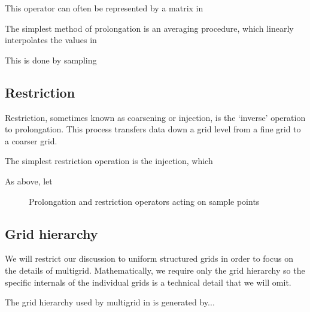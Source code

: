 This operator can often be represented by a matrix in 

The simplest method of prolongation is an averaging procedure, which linearly interpolates the values in

This is done by sampling




\subsection{Restriction}

Restriction, sometimes known as coarsening or injection, is the `inverse' operation to prolongation.
This process transfers data down a grid level from a fine grid to a coarser grid.

The simplest restriction operation is the injection, which 


As above, let 





\begin{figure}
	\caption{Prolongation and restriction operators acting on sample points}
\end{figure}




\subsection{Grid hierarchy}

We will restrict our discussion to uniform structured grids in order to focus on the details of multigrid.
Mathematically, we require only the grid hierarchy so the specific internals of the individual grids is a technical detail that we will omit. 

The grid hierarchy used by multigrid in \oomph is generated by... 



\begin{figure}
	\caption{}
\end{figure}






